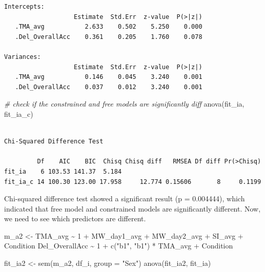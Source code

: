 \documentclass[
  letterpaper,
  DIV=11,
  numbers=noendperiod]{scrartcl}
\newenvironment{Shaded}{\begin{snugshade}}{\end{snugshade}}
\newcommand{\AttributeTok}[1]{\textcolor[rgb]{0.49,0.56,0.16}{#1}}
\newcommand{\CommentTok}[1]{\textcolor[rgb]{0.38,0.63,0.69}{\textit{#1}}}
\newcommand{\FunctionTok}[1]{\textcolor[rgb]{0.02,0.16,0.49}{#1}}
\newcommand{\NormalTok}[1]{\textcolor[rgb]{0.00,0.44,0.13}{#1}}
\newcommand{\OtherTok}[1]{\textcolor[rgb]{0.00,0.44,0.13}{#1}}
\newcommand{\StringTok}[1]{\textcolor[rgb]{0.25,0.44,0.63}{#1}}
\begin{document}
\begin{verbatim}
Intercepts:
                   Estimate  Std.Err  z-value  P(>|z|)
   .TMA_avg           2.633    0.502    5.250    0.000
   .Del_OverallAcc    0.361    0.205    1.760    0.078

Variances:
                   Estimate  Std.Err  z-value  P(>|z|)
   .TMA_avg           0.146    0.045    3.240    0.001
   .Del_OverallAcc    0.037    0.012    3.240    0.001
\end{verbatim}

\begin{Shaded}
\begin{Highlighting}[]
\CommentTok{\# check if the constrained and free models are significantly diff}
\FunctionTok{anova}\NormalTok{(fit\_ia, fit\_ia\_c)}
\end{Highlighting}
\end{Shaded}

\begin{verbatim}

Chi-Squared Difference Test

         Df    AIC    BIC  Chisq Chisq diff   RMSEA Df diff Pr(>Chisq)
fit_ia    6 103.53 141.37  5.184                                      
fit_ia_c 14 100.30 123.00 17.958     12.774 0.15606       8     0.1199
\end{verbatim}

Chi-squared difference test showed a significant result (p = 0.004444),
which indicated that free model and constrained models are significantly
different. Now, we need to see which predictors are different.

\begin{Shaded}
\begin{Highlighting}[]
\NormalTok{m\_a2 }\OtherTok{\textless{}{-}} \StringTok{\textquotesingle{}}
\StringTok{  TMA\_avg \textasciitilde{} 1 + MW\_day1\_avg + MW\_day2\_avg + SI\_avg + Condition}
\StringTok{  Del\_OverallAcc \textasciitilde{} 1 + c("b1", "b1") * TMA\_avg + Condition}
\StringTok{\textquotesingle{}}
\end{Highlighting}
\end{Shaded}

\begin{Shaded}
\begin{Highlighting}[]
\NormalTok{fit\_ia2 }\OtherTok{\textless{}{-}} \FunctionTok{sem}\NormalTok{(m\_a2, df\_i, }\AttributeTok{group =} \StringTok{"Sex"}\NormalTok{)}
\FunctionTok{anova}\NormalTok{(fit\_ia2, fit\_ia)}
\end{Highlighting}
\end{Shaded}
\end{document}
